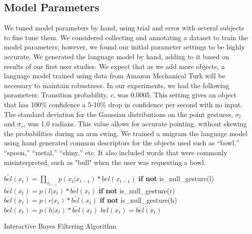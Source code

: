 \documentclass[letterpaper, 10 pt, conference]{ieeeconf}
\begin{document}
\subsection{Model Parameters}
We tuned model parameters by hand, using trial and error with several
subjects to fine tune them.  We considered collecting and annotating a
dataset to train the model parameters; however, we found our initial
parameter settings to be highly accurate.  We generated the language
model by hand, adding to it based on results of our first user
studies.  We expect that as we add more objects, a language model
trained using data from Amazon Mechanical Turk will be necessary to
maintain robustness.  In our experiments, we had the following
parameters: Transition probability, $c$, was 0.0005. This setting
gives an object that has 100\% confidence a 5-10\% drop in confidence
per second with no input.  The standard deviation for the Gaussian
distributions on the point gestures, $\sigma_l$ and $\sigma_r$, was
1.0 radians.  This value allows for accurate pointing, without skewing
the probabilities during an arm swing.  We trained a unigram the
language model using hand generated common descriptors for the objects
used such as ``bowl,'' ``spoon,'' ``metal,'' ``shiny,'' etc. It also
included words that were commonly misinterpreted, such as "bull" when
the user was requesting a bowl. 





\begin{algorithm}
    \DontPrintSemicolon
    \BlankLine
    \BlankLine
     {
      $\bar{bel}(x_t) = \displaystyle\prod_{x_{t-1}} p(x_t|x_{t-1})*bel(x_{t-1})$
      \BlankLine
      \textbf{if not} is\_null\_gesture(l)
      \BlankLine
      \Indp$\bar{bel}(x_t) = p(l | x_t) *  \bar{bel}(x_t)$
      \BlankLine
      \Indm\textbf{if not} is\_null\_gesture(r)
      \BlankLine
      \Indp$\bar{bel}(x_t) = p(r | x_t) *  \bar{bel}(x_t)$
      \BlankLine
      \Indm\textbf{if not} is\_null\_gesture(h)
      \BlankLine
      \Indp$\bar{bel}(x_t) = p(h | x_t) *  \bar{bel}(x_t)$
      \BlankLine
      \Indm{}
      $bel(x_t) = \bar{bel}(x_t)$

    }
    \BlankLine
\caption{Interactive Bayes Filtering Algorithm} 
\label{alg:algorithm}
\end{algorithm}
\end{document}
